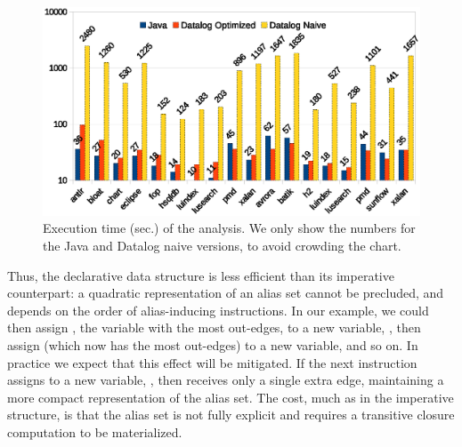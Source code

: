 \begin{figure}[h]
  \begin{minipage}[b]{\linewidth}
    \centering
    \includegraphics[clip,width=0.77\linewidth, height=0.4275\linewidth]{assets/must-data/time.eps}
  \end{minipage}
  \caption{Execution time (sec.) of the analysis. We only show the numbers for the Java and Datalog naive versions, to avoid crowding the chart.}
    \label{fig:time}
\end{figure}


Thus, the declarative data structure is less efficient than its
imperative counterpart: a quadratic representation of an alias set
cannot be precluded, and depends on the order of alias-inducing
instructions. In our example, we could then assign , the
variable with the most out-edges, to a new variable, , then
assign  (which now has the most out-edges) to a new variable,
and so on.  In practice we expect that this effect will be mitigated.
If the next instruction assigns  to a new variable, , then
 receives only a single extra edge, maintaining a more compact
representation of the alias set. The cost, much as in the imperative
structure, is that the alias set is not fully explicit and requires a
transitive closure computation to be materialized.




